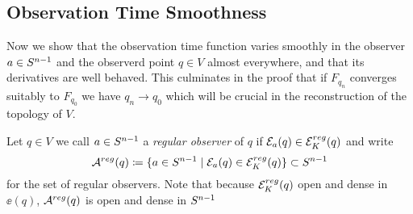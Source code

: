 \subsection{Observation Time Smoothness}
Now we show that the observation time function varies smoothly in the observer $a\in {S^{n-1}}$ and the observerd point $q\in V$ almost everywhere, and that its derivatives are well behaved. This culminates in the proof that if $F_{q_n}$ converges suitably to $F_{q_0}$ we have $q_n\to q_0$ which will be crucial in the reconstruction of the topology of $V$.
\begin{definition}
    Let $q\in V$ we call $a\in {S^{n-1}}$ a \emph{regular observer} of $q$ if ${\mathcal{E}}_{a}(q)\in {{\mathcal{E}}^{reg}_K}(q)$ and write 
    \[
        {\mathcal{A}}^{reg}(q) \coloneqq  \{ a\in {S^{n-1}} \mid {\mathcal{E}}_{a}(q)\in {{\mathcal{E}}^{reg}_K}(q) \} \subset {S^{n-1}}
    \] for the set of regular observers. Note that because ${{\mathcal{E}}^{reg}_K}(q)$ open and dense in $\ee(q)$, ${{\mathcal{A}}^{reg}}(q)$ is open and dense in ${S^{n-1}}$
\end{definition}

